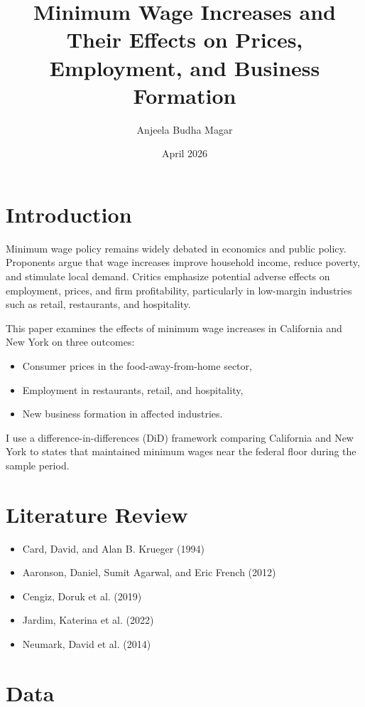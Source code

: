 \documentclass[11pt]{article}
\title{Minimum Wage Increases and Their Effects on Prices, Employment, and Business Formation}
\author{Anjeela Budha Magar}
\date{April 2026}
\begin{document}
\maketitle

\section{Introduction}

Minimum wage policy remains widely debated in economics and public policy. Proponents argue that wage increases improve household income, reduce poverty, and stimulate local demand. Critics emphasize potential adverse effects on employment, prices, and firm profitability, particularly in low-margin industries such as retail, restaurants, and hospitality.

This paper examines the effects of minimum wage increases in California and New York on three outcomes:
\begin{itemize}
    \item Consumer prices in the food-away-from-home sector,
    \item Employment in restaurants, retail, and hospitality,
    \item New business formation in affected industries.
\end{itemize}

I use a difference-in-differences (DiD) framework comparing California and New York to states that maintained minimum wages near the federal floor during the sample period.

\section{Literature Review}

\begin{itemize}
    \item Card, David, and Alan B. Krueger (1994) \cite{card1994minimum}
    \item Aaronson, Daniel, Sumit Agarwal, and Eric French (2012) \cite{aaronson2012spending}
    \item Cengiz, Doruk et al. (2019) \cite{cengiz2019effect}
    \item Jardim, Katerina et al. (2022) \cite{jardim2022minimum}
    \item Neumark, David et al. (2014) \cite{neumark2014revisiting}
\end{itemize}

\section{Data}
\end{document}
